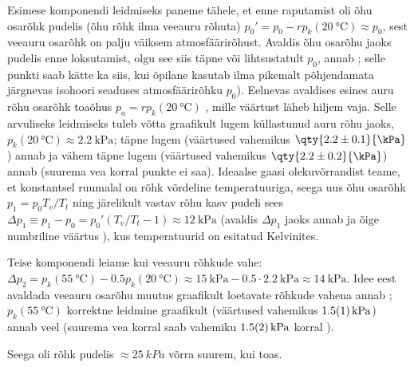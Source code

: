 Esimese komponendi leidmiseks paneme tähele, et enne raputamist oli õhu osarõhk pudelis (õhu rõhk ilma veeauru rõhuta) $p_0'=p_0-rp_k(\qty{20}\celsius)\approx p_0$, sest veeauru osarõhk on palju väiksem atmosfäärirõhust. Avaldis õhu osarõhu jaoks pudelis enne loksutamist, olgu see siis täpne või lihtsustatult $p_0$, annab ; selle punkti saab kätte ka siis, kui õpilane kasutab ilma pikemalt põhjendamata järgnevas isohoori seaduses atmosfäärirõhku $p_0$). Eelnevas avaldises esines auru rõhu osarõhk toaõhus $p_a=rp_k(\qty{20}\celsius)$ , mille väärtust läheb hiljem vaja.  Selle arvuliseks leidmiseks tuleb võtta graafikult lugem küllastunud auru rõhu jaoks, $p_k(\qty{20}\celsius)\approx \qty{2.2}{\kPa}$; täpne lugem (väärtused vahemikus $\qty{2.2\pm 0.1}{\kPa}$) annab  ja vähem täpne lugem (väärtused vahemikus $\qty{2.2\pm 0.2}{\kPa}$) annab  (suurema vea korral punkte ei saa). Ideaalse gaasi olekuvõrrandist teame, et konstantsel ruumalal on rõhk võrdeline temperatuuriga, seega uus õhu osarõhk $p_1= p_0T_v/T_t$  ning järelikult vastav rõhu kasv pudeli sees $\Delta p_1\equiv p_1-p_0=p_0'(T_v/T_t-1)\approx \SI{12}{\kPa}$ (avaldis $\Delta p_1$ jaoks annab  ja õige numbriline väärtus ), kus temperatuurid on esitatud Kelvinites.

Teise komponendi leiame kui veeauru rõhkude vahe: $\Delta p_2 = p_k(\qty{55}{\celsius}) - \num{0.5}p_k(\qty{20}{\celsius}) \approx \SI{15}{\kPa} -\num{0.5}\cdot\qty{2.2}{\kPa}\approx \qty{14}{\kPa}$. Idee eest avaldada veeauru osarõhu muutus graafikult loetavate rõhkude vahena annab ; $p_k(\SI{55}\celsius)$ korrektne leidmine graafikult (väärtused vahemikus $\SI{1.5\pm 0.1}{kPa}$)  annab veel  (suurema vea korral saab vahemiku $\SI{1.5\pm 0.2}{kPa}$ korral ).

Seega oli rõhk pudelis $\approx \SI{25}{kPa}$ võrra suurem, kui toas.
\probend